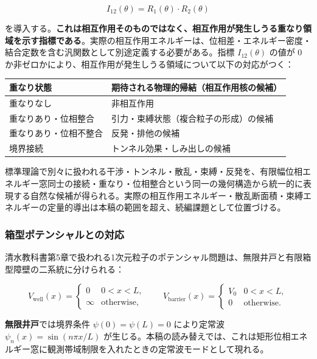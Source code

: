 \documentclass[
]{ltjsarticle}
\newcounter{none} %
\begin{document}
\[
I_{12}(\theta) = R_1(\theta) \cdot R_2(\theta)
\]

を導入する。\textbf{これは相互作用そのものではなく、相互作用が発生しうる重なり領域を示す指標である}。実際の相互作用エネルギーは、位相差・エネルギー密度・結合定数を含む汎関数として別途定義する必要がある。指標
\(I_{12}(\theta)\) の値が 0
か非ゼロかにより、相互作用が発生しうる領域について以下の対応がつく：

{\def\LTcaptype{none} %
\begin{longtable}[]{@{}ll@{}}
\toprule\noalign{}
重なり状態 & 期待される物理的帰結（相互作用核の候補） \\
\midrule\noalign{}
\endhead
\bottomrule\noalign{}
\endlastfoot
重なりなし & 非相互作用 \\
重なりあり・位相整合 & 引力・束縛状態（複合粒子の形成）の候補 \\
重なりあり・位相不整合 & 反発・排他の候補 \\
境界接続 & トンネル効果・しみ出しの候補 \\
\end{longtable}
}

標準理論で別々に扱われる干渉・トンネル・散乱・束縛・反発を、有限幅位相エネルギー窓同士の接続・重なり・位相整合という同一の幾何構造から統一的に表現する自然な候補が得られる。実際の相互作用エネルギー・散乱断面積・束縛エネルギーの定量的導出は本稿の範囲を超え、続編課題として位置づける。

\subsubsection{箱型ポテンシャルとの対応}\label{ux7bb1ux578bux30ddux30c6ux30f3ux30b7ux30e3ux30ebux3068ux306eux5bfeux5fdc}

清水教科書第5章で扱われる1次元粒子のポテンシャル問題は、無限井戸と有限箱型障壁の二系統に分けられる：

\[
V_{\mathrm{well}}(x) = \begin{cases}
0 & 0 < x < L, \\
\infty & \text{otherwise},
\end{cases}
\qquad
V_{\mathrm{barrier}}(x) = \begin{cases}
V_0 & 0 < x < L, \\
0 & \text{otherwise}.
\end{cases}
\]

\textbf{無限井戸}では境界条件 \(\psi(0) = \psi(L) = 0\) により定常波
\(\psi_n(x) = \sin(n\pi x / L)\)
が生じる。本稿の読み替えでは、これは矩形位相エネルギー窓に観測帯域制限を入れたときの定常波モードとして現れる。
\end{document}
